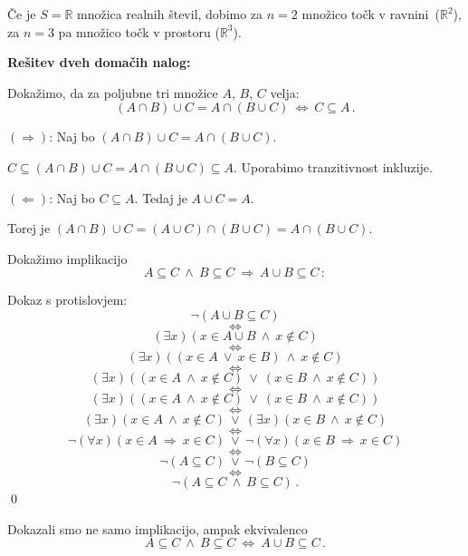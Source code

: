 \documentclass[11pt,paper=b5,DIV=13,headinclude,footinclude]{scrbook}
\newcounter{example}
\def\ali {{~\vee~}}
\def\inn {{~\wedge~}}
\def\sledi {{~\Rightarrow~}}
\def\cee {{~\Leftrightarrow~}}
\begin{document}
\begin{example*}
Če je $S = \mathbb{R}$ množica realnih števil,
dobimo za $n = 2$ množico točk v ravnini~($\mathbb{R}^2$), za
$n = 3$ pa množico točk v prostoru ($\mathbb{R}^3$).\end{example*}

\bigskip

%
%
\bigskip
\textbf{ Rešitev dveh domačih nalog:}

Dokažimo, da za poljubne tri množice $A$, $B$, $C$ velja:
$$(A\cap B)\cup C = A\cap (B\cup C) \cee C\subseteq A\,.$$

\medskip
$(\Rightarrow)$:
Naj bo $(A\cap B)\cup C = A\cap (B\cup C)$.

$C\subseteq (A\cap B)\cup C = A\cap (B\cup C)\subseteq A$. Uporabimo tranzitivnost inkluzije.

\medskip
$(\Leftarrow)$:
Naj bo $C\subseteq A$. Tedaj je $A\cup C = A$.

Torej je
$(A\cap B)\cup C = (A\cup C)\cap (B\cup C) = A\cap (B\cup C)$.

\bigskip
Dokažimo implikacijo
$$A\subseteq C\inn B\subseteq C\sledi A\cup B \subseteq C\,:$$

Dokaz s protislovjem:
$$\neg(A\cup B\subseteq C)$$
$$\cee$$
$$(\exists x)(x\in A\cup B\inn x\not\in C)$$
$$\cee$$
$$(\exists x)((x\in A \ali x\in B)\inn x\not\in C)$$
$$\cee$$
$$(\exists x)((x\in A \inn x\not\in C) \ali (x\in B\inn x\not\in C))$$
$$\cee$$
$$(\exists x)((x\in A \inn x\not\in C) \ali (x\in B\inn x\not\in C))$$
$$\cee$$
$$(\exists x)(x\in A \inn x\not\in C) \ali (\exists x)(x\in B\inn x\not\in C)$$
$$\cee$$
$$\neg(\forall x)(x\in A\sledi x\in C)\ali\neg(\forall x)(x\in B\sledi x\in C)$$
$$\cee$$
$$\neg(A \subseteq C) \ali \neg(B\subseteq C)$$
$$\cee$$
$$\neg(A \subseteq C \inn B\subseteq C)\,.$$
\qed

Dokazali smo ne samo implikacijo, ampak ekvivalenco
$$A\subseteq C\inn B\subseteq C\cee A\cup B \subseteq C\,.$$
\end{document}
